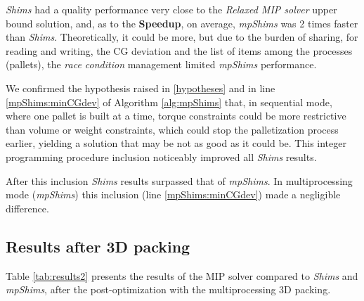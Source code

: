 \documentclass[preprint,authoryear]{elsarticle}
\begin{document}
{\it Shims} had a quality performance very close to the {\it Relaxed MIP solver} upper bound solution, and, as to the {\bf Speedup}, on average, {\it mpShims} was 2 times faster than {\it Shims}. Theoretically, it could be more, but due to the burden of sharing, for reading and writing, the CG deviation and the list of items among the processes (pallets), the {\it race condition} management limited {\it mpShims} performance.

We confirmed the hypothesis raised in \ref{hypotheses} and in line \ref{mpShims:minCGdev} of Algorithm \ref{alg:mpShims} that, in sequential mode, where one pallet is built at a time, torque constraints could be more restrictive than volume or weight constraints, which could stop the palletization process earlier, yielding a solution that may be not as good as it could be. This integer programming procedure inclusion noticeably improved all {\it Shims} results.

After this inclusion {\it Shims} results surpassed that of {\it mpShims}. In multiprocessing mode ({\it mpShims}) this inclusion (line \ref{mpShims:minCGdev}) made a negligible difference.

\subsection{Results {\bf after} 3D packing}

Table \ref{tab:results2} presents the results of the MIP solver compared to {\it Shims} and {\it mpShims}, after the post-optimization with the multiprocessing 3D packing.
\end{document}
